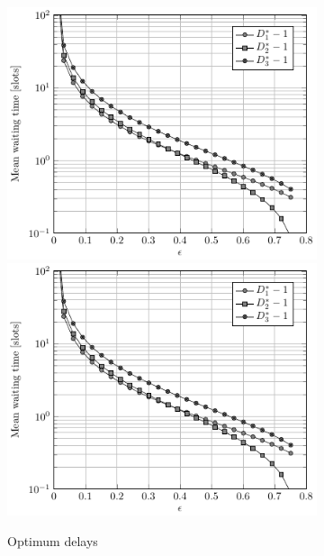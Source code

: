 \begin{figure}
\begin{subfigure}[t]{.45\textwidth}
  \centering
    \if{}
        \includegraphics[width=\textwidth]{Figures/Ch7_Opt_D_eps.pdf}
    \else
        \includegraphics[draft,width=\textwidth]{Figures/Ch7_Opt_D_eps.pdf}
    \fi
    \caption{Optimum delays}
    \label{fig:Opt_D_eps}
\end{subfigure}%
\begin{subfigure}{.05\textwidth}
    \hspace{.05\textwidth}
\end{subfigure}%
\begin{subfigure}[t]{.45\textwidth}%
  \centering

\end{subfigure}
\end{figure}

